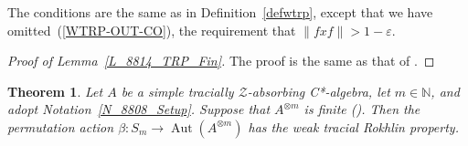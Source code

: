 \documentclass[11pt]{amsart}
\theoremstyle{plain}
\newtheorem{theorem}{Theorem}[section]
\theoremstyle{definition}
\theoremstyle{remark}
\numberwithin{equation}{section}
\newcommand{\N}{\mathbb{N}}
\newcommand{\bt}{\beta}
\newcommand{\Aut}{{\operatorname{Aut}}}
\begin{document}
The conditions are the same as in
Definition~\ref{defwtrp},
except that we have omitted~(\ref{WTRP-OUT-CO}),
the requirement that
$\|f x f\| > 1 - \varepsilon$.

\begin{proof}[Proof of Lemma~\ref{L_8814_TRP_Fin}]
The proof is the same as that of \cite[Proposition~7.12]{AGJP21}.
\end{proof}

\begin{theorem}\label{T_8816_PermwTRP}
Let $A$
be a simple tracially $\mathcal{Z}$-absorbing C*-algebra,
let $m \in \N$,
and adopt Notation~\ref{N_8808_Setup}.
Suppose that $A^{\otimes m}$ is finite
(\cite[Definition~7.1]{AGJP21}).
Then the permutation action $\bt \colon S_m \to \Aut (A^{\otimes m})$
has the weak tracial Rokhlin property.
\end{theorem}
\end{document}
